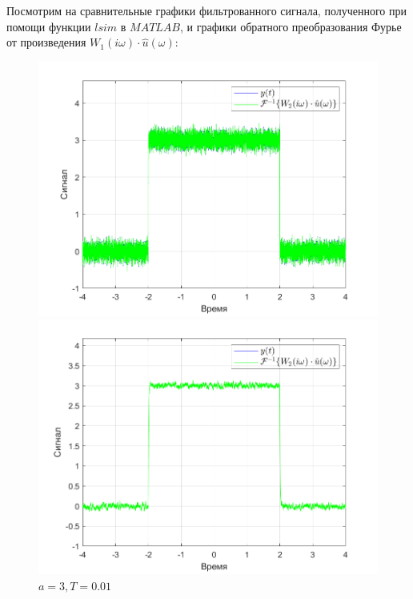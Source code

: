 \documentclass[a4paper]{article}
\begin{document}
Посмотрим на сравнительные графики фильтрованного сигнала, полученного при помощи функции $lsim$ в $MATLAB$, и графики обратного преобразования Фурье от произведения $W_1(i\omega) \cdot \hat{u}(\omega)$:

\begin{figure}[H]
    \begin{minipage}{0.5\textwidth}
        \centering
        \includegraphics[width=\linewidth]{ex1_1/a=3_T=0.001/h2.png}
        \caption{$a = 3, T = 0.001$}
    \end{minipage}
    \begin{minipage}{0.5\textwidth}
        \centering
        \includegraphics[width=\linewidth]{ex1_1/a=3_T=0.01/h2.png}
        \caption{$a = 3, T = 0.01$}
    \end{minipage}
\end{figure}
\end{document}
